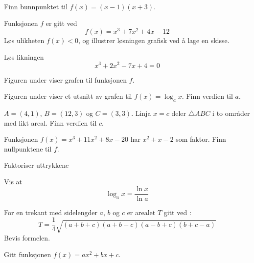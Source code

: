 Finn bunnpunktet til $f(x)=(x-1)(x+3)$.

Funksjonen $f$ er gitt ved
\[ f(x)=x^3+7x^2+4x-12 \]
Løs ulikheten $f(x)<0$, og illustrer løsningen grafisk ved å lage en skisse.

Løs likningen 
\[ x^3+2x^2-7x+4=0 \]

\newpage
{}
Figuren under viser grafen til funksjonen $f$.

Figuren under viser et utsnitt av grafen til $f(x)=\log_{a} x$. Finn verdien til $a$.


$A=(4, 1)$, $B=(12, 3)$ og $C=(3, 3)$. Linja $x=c$ deler $\triangle ABC$ i to områder med likt areal. Finn verdien til $c$.

Funksjonen $f(x)=x^3+11x^2+8x-20$ har $x^2+x-2$ som faktor. Finn nullpunktene til $f$.

Faktoriser uttrykkene 

Vis at
\[ \log_{a} x = \frac{\ln x}{\ln a} \]


For en trekant med sidelengder $ a $, $ b $ og $ c $ er arealet $ T $ gitt ved :
\[ T=\frac{1}{4}\sqrt{(a+b+c)(a+b-c)(a-b+c)(b+c-a)} \]
Bevis formelen.

Gitt funksjonen $f(x)=ax^2+bx+c$. 

